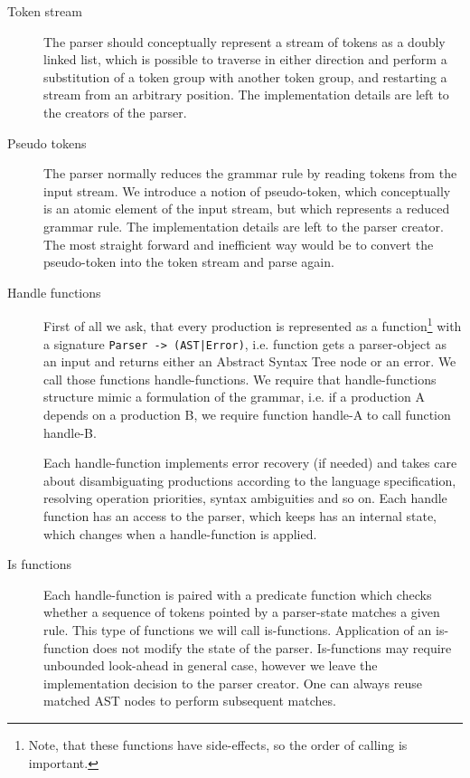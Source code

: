 \begin{description}
    \item[Token stream] The parser should conceptually represent
    a stream of tokens as a doubly linked list, which is possible
    to traverse in either direction and perform a substitution of
    a token group with another token group, and restarting a 
    stream from an arbitrary position.  The implementation details
    are left to the creators of the parser.

    \item[Pseudo tokens] The parser normally reduces the grammar rule
    by reading tokens from the input stream.  We introduce a notion
    of pseudo-token, which conceptually is an atomic element of the 
    input stream, but which represents a reduced grammar rule.  The 
    implementation details are left to the parser creator.  The most
    straight forward and inefficient way would be to convert the 
    pseudo-token into the token stream and parse again.
    
    \item[Handle functions] First of all we ask, that every production
    is represented as a function\footnote{Note, that these functions
    have side-effects, so the order of calling is important.} with a
    signature \verb/Parser -> (AST|Error)/, i.e. function gets a
    parser-object as an input and returns either an Abstract Syntax Tree
    node or an error.  We call those functions handle-functions. We
    require that handle-functions structure mimic a formulation of the
    grammar, i.e.  if a production A depends on a production B, we
    require function handle-A to call function handle-B.

    Each handle-function implements error recovery (if needed) and takes
    care about disambiguating productions according to the language
    specification, resolving operation priorities, syntax ambiguities
    and so on.  Each handle function has an access to the parser, which
    keeps has an internal state, which changes when a handle-function is
    applied.  
    
    \item[Is functions] Each handle-function is paired with a predicate
    function which checks whether a sequence of tokens pointed by a
    parser-state matches a given rule.  This type of functions we will
    call is-functions.  Application of an is-function does not modify
    the state of the parser.  Is-functions may require unbounded
    look-ahead in general case, however we leave the implementation
    decision to the parser creator.  One can always reuse matched AST
    nodes to perform subsequent matches.


\end{description}
